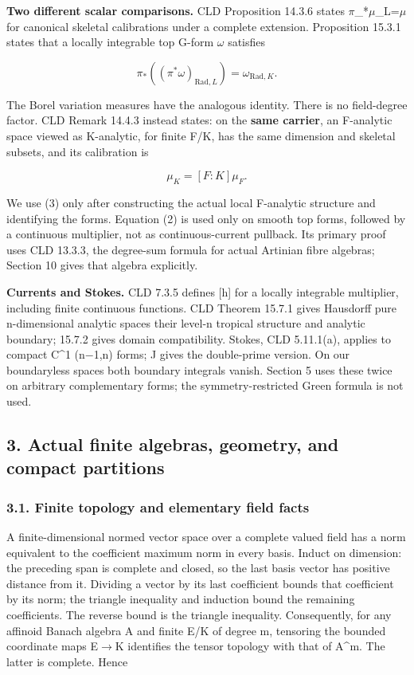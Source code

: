 \documentclass[
  10pt,
]{article}
\begin{document}
\textbf{Two different scalar comparisons.} CLD Proposition 14.3.6 states
\ensuremath{\pi}\_*\ensuremath{\mu}\_L=\ensuremath{\mu} for canonical skeletal calibrations under a complete
extension. Proposition 15.3.1 states that a locally integrable top
G-form \ensuremath{\omega} satisfies

\[
 \pi_*((\pi^*\omega)_{\mathrm{Rad},L})
                 =\omega_{\mathrm{Rad},K}.                 \tag{2}
\]

The Borel variation measures have the analogous identity. There is no
field-degree factor. CLD Remark 14.4.3 instead states: on the
\textbf{same carrier}, an F-analytic space viewed as K-analytic, for
finite F/K, has the same dimension and skeletal subsets, and its
calibration is

\[
                      \mu_K=[F:K]\mu_F.                    \tag{3}
\]

We use (3) only after constructing the actual local F-analytic structure
and identifying the forms. Equation (2) is used only on smooth top
forms, followed by a continuous multiplier, not as continuous-current
pullback. Its primary proof uses CLD 13.3.3, the degree-sum formula for
actual Artinian fibre algebras; Section 10 gives that algebra
explicitly.

\textbf{Currents and Stokes.} CLD 7.3.5 defines {[}h{]} for a locally
integrable multiplier, including finite continuous functions. CLD
Theorem 15.7.1 gives Hausdorff pure n-dimensional analytic spaces their
level-n tropical structure and analytic boundary; 15.7.2 gives domain
compatibility. Stokes, CLD 5.11.1(a), applies to compact C\^{}1 (n\ensuremath{-}1,n)
forms; J gives the double-prime version. On our boundaryless spaces both
boundary integrals vanish. Section 5 uses these twice on arbitrary
complementary forms; the symmetry-restricted Green formula is not used.

\subsection{3. Actual finite algebras, geometry, and compact
partitions}\label{actual-finite-algebras-geometry-and-compact-partitions}

\subsubsection{3.1. Finite topology and elementary field
facts}\label{finite-topology-and-elementary-field-facts}

A finite-dimensional normed vector space over a complete valued field
has a norm equivalent to the coefficient maximum norm in every basis.
Induct on dimension: the preceding span is complete and closed, so the
last basis vector has positive distance from it. Dividing a vector by
its last coefficient bounds that coefficient by its norm; the triangle
inequality and induction bound the remaining coefficients. The reverse
bound is the triangle inequality. Consequently, for any affinoid Banach
algebra A and finite E/K of degree m, tensoring the bounded coordinate
maps E\ensuremath{\to}K identifies the tensor topology with that of A\^{}m. The latter
is complete. Hence
\end{document}
